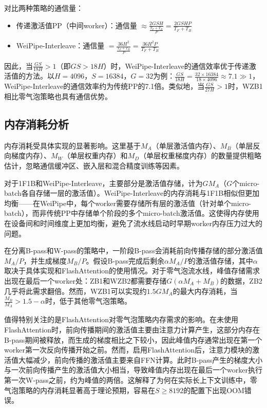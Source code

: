对比两种策略的通信量：
\begin{itemize}
    \item 传递激活值PP（中间worker）：通信量 $\approx \frac{2GSH}{\frac{T_F+T_B}{P}} = \frac{2GSHP}{T_F+T_B}$
    \item WeiPipe-Interleave：通信量 $= \frac{36H^2}{\frac{T_F+T_B}{P}} = \frac{36H^2 P}{T_F+T_B}$
\end{itemize}

因此，当$\frac{GS}{18H} > 1$（即$GS > 18H$）时，WeiPipe-Interleave的通信效率优于传递激活值的方法。以$H=4096$，$S=16384$，$G=32$为例：$\frac{GS}{18H} = \frac{32 \times 16384}{18 \times 4096} \approx 7.1 \gg 1$，WeiPipe-Interleave的通信效率约为传统PP的7.1倍。类似地，当$\frac{GS}{27H} > 1$时，WZB1相比零气泡策略也具有通信优势。

\subsection{内存消耗分析}

内存消耗受具体实现的显著影响。这里基于$M_A$（单层激活值内存）、$M_B$（单层反向梯度内存）、$M_W$（单层权重内存）和$M_D$（单层权重梯度内存）的数量提供粗略估计，忽略通信缓冲区、嵌入层和混合精度训练等因素。

对于1F1B和WeiPipe-Interleave，主要部分是激活值存储，计为$GM_A$（$G$个micro-batch各自存储一层的激活值）。WeiPipe-Interleave的内存消耗与1F1B相似但更加均衡——在WeiPipe中，每个worker需要存储所有层的激活值（针对单个micro-batch），而非传统PP中存储单个阶段的多个micro-batch激活值。这使得内存使用在设备间和时间维度上更加均衡，避免了流水线启动时早期worker内存压力过大的问题。

在分离B-pass和W-pass的策略中，一阶段B-pass会消耗前向传播存储的部分激活值$M_A/P$，并生成梯度$M_B/P$。假设B-pass完成后剩余$\alpha M_A/P$的激活值存储，其中$\alpha$取决于具体实现和FlashAttention的使用情况。对于零气泡流水线，峰值存储需求出现在最后一个worker处：ZB1和WZB2都需要存储$G(\alpha M_A+M_B)$的数据，ZB2几乎将此需求翻倍。然而，WZB1可以实现约$1.5GM_A$的最大内存消耗，当$\frac{M_B}{M_A} > 1.5-\alpha$时，低于其他零气泡策略。

值得特别关注的是FlashAttention对零气泡策略内存需求的影响。在未使用FlashAttention时，前向传播期间的激活值主要由注意力计算产生，这部分内存在B-pass期间被释放，而生成的梯度相比之下较小，因此峰值内存通常出现在第一个worker第一次反向传播开始之前。然而，启用FlashAttention后，注意力模块的激活值大幅减少，前向传播的激活值主要来自FFN计算。此时B-pass产生的梯度大小与一次前向传播产生的激活值大小相当，导致峰值内存出现在最后一个worker执行第一次W-pass之前，约为峰值的两倍。这解释了为何在实际长上下文训练中，零气泡策略的内存消耗显著高于理论预期，容易在$S \ge 8192$的配置下出现OOM错误。

